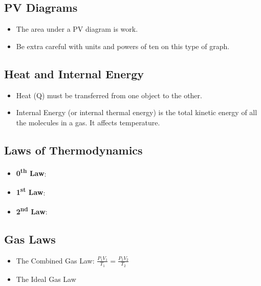 \documentclass[letterpaper, 12pt]{article}
\begin{document}
	
\subsection*{PV Diagrams}
\begin{itemize}
			\item The area under a PV diagram is work.
			\item Be extra careful with units and powers of ten on this type of graph.
\end{itemize}

	
\subsection*{{Heat and Internal Energy}}

	\begin{itemize}
	\item Heat (Q) must be transferred from one object to the other.
	\item Internal Energy (or internal thermal energy) is the total kinetic energy of all the molecules in a gas.  It affects temperature.
	
\end{itemize}

\subsection*{Laws of Thermodynamics}
\begin{itemize}
	\item \textbf{0\textsuperscript{th} Law}: 
	\item  \textbf{1\textsuperscript{st} Law}: 
	\item  \textbf{2\textsuperscript{nd} Law}: 
	
\end{itemize}



\subsection*{Gas Laws}
\begin{itemize}
	\item The Combined Gas Law: $\frac{P_1 V_1}{T_1} = \frac{P_2 V_2}{T_2}$ 
	\item The Ideal Gas Law
\end{itemize}
 
\end{document}
